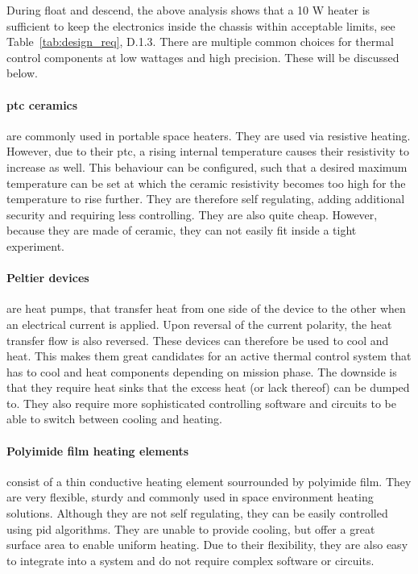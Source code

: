 \documentclass[
  a4paper,
  11pt,
  openany,
  parskip,
  toc=totoc,
  listof=totoc,
  bibliography=totoc
]{scrreprt}
\newcommand{\tref}[1]{Table~\ref{#1}}
\begin{document}
During float and descend, the above analysis shows that a 10 W heater is sufficient to keep the electronics inside the chassis within acceptable limits, see \tref{tab:design_req}, D.1.3. There are multiple common choices for thermal control components at low wattages and high precision. These will be discussed below.
\paragraph{\gls{ptc} ceramics} are commonly used in portable space heaters. They are used via resistive heating. However, due to their \gls{ptc}, a rising internal temperature causes their resistivity to increase as well. This behaviour can be configured, such that a desired maximum temperature can be set at which the ceramic resistivity becomes too high for the temperature to rise further. They are therefore self regulating, adding additional security and requiring less controlling. They are also quite cheap. However, because they are made of ceramic, they can not easily fit inside a tight experiment. 

\paragraph{Peltier devices} are heat pumps, that transfer heat from one side of the device to the other when an electrical current is applied. Upon reversal of the current polarity, the heat transfer flow is also reversed. These devices can therefore be used to cool and heat. This makes them great candidates for an active thermal control system that has to cool and heat components depending on mission phase. The downside is that they require heat sinks that the excess heat (or lack thereof) can be dumped to. They also require more sophisticated controlling software and circuits to be able to switch between cooling and heating.

\paragraph{Polyimide film heating elements} consist of a thin conductive heating element sourrounded by polyimide film. They are very flexible, sturdy and commonly used in space environment heating solutions. Although they are not self regulating, they can be easily controlled using \gls{pid} algorithms. They are unable to provide cooling, but offer a great surface area to enable uniform heating. Due to their flexibility, they are also easy to integrate into a system and do not require complex software or circuits.\par  
\end{document}
